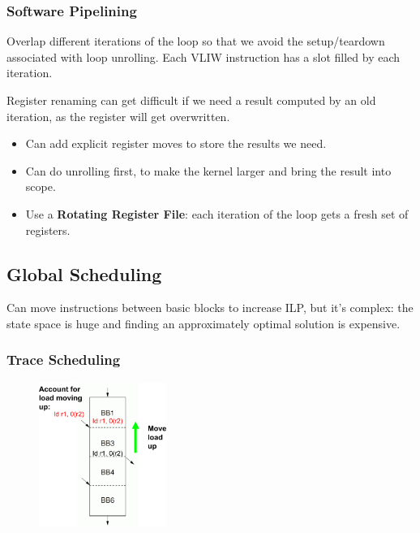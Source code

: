 \documentclass[11pt]{article}
\begin{document}
{{        \subsubsection*{Software Pipelining}
        {
            Overlap different iterations of the loop so that we avoid the setup/teardown associated with loop unrolling. Each VLIW instruction has a slot filled by each iteration.

            Register renaming can get difficult if we need a result computed by an old iteration, as the register will get overwritten.

            \begin{itemize}
            \item Can add explicit register moves to store the results we need.
            \item Can do unrolling first, to make the kernel larger and bring the result into scope.
            \item Use a \textbf{Rotating Register File}: each iteration of the loop gets a fresh set of registers.
            \end{itemize}
        }
    }
    \subsection*{Global Scheduling}
    {
        Can move instructions between basic blocks to increase ILP, but it's complex: the state space is huge and finding an approximately optimal solution is expensive.

        \subsubsection*{Trace Scheduling}
        {
            \begin{figure}
            \centering
            \includegraphics[width=0.37\textwidth]{trace-scheduling.png}
            \end{figure}

}}}
\end{document}
